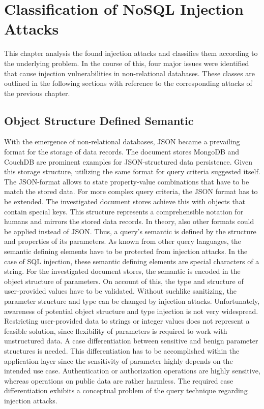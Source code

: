 \chapter{Classification of NoSQL Injection Attacks}
\label{cha:classification}
This chapter analysis the found injection attacks and classifies them according to the underlying problem. In the course of this, four major issues were identified that cause injection vulnerabilities in non-relational databases. These classes are outlined in the following sections with reference to the corresponding attacks of the previous chapter.

\section{Object Structure Defined Semantic}
With the emergence of non-relational databases, JSON became a prevailing format for the storage of data records. The document stores MongoDB and CouchDB are prominent examples for JSON-structured data persistence. Given this storage structure, utilizing the same format for query criteria suggested itself. The JSON-format allows to state property-value combinations that have to be match the stored data. For more complex query criteria, the JSON format has to be extended. The investigated document stores achieve this with objects that contain special keys. This structure represents a comprehensible notation for humans and mirrors the stored data records. In theory, also other formats could be applied instead of JSON. Thus, a query's semantic is defined by the structure and properties of its parameters. As known from other query languages, the semantic defining elements have to be protected from injection attacks. In the case of SQL injection, these semantic defining elements are special characters of a string. For the investigated document stores, the semantic is encoded in the object structure of parameters. On account of this, the type and structure of user-provided values have to be validated. Without suchlike sanitizing, the parameter structure and type can be changed by injection attacks. Unfortunately, awareness of potential object structure and type injection is not very widespread. Restricting user-provided data to strings or integer values does not represent a feasible solution, since flexibility of parameters is required to work with unstructured data. A case differentiation between sensitive and benign parameter structures is needed. This differentiation has to be accomplished within the application layer since the sensitivity of parameter highly depends on the intended use case. Authentication or authorization operations are highly sensitive, whereas operations on public data are rather harmless. The required case differentiation exhibits a conceptual problem of the query technique regarding injection attacks.\\

